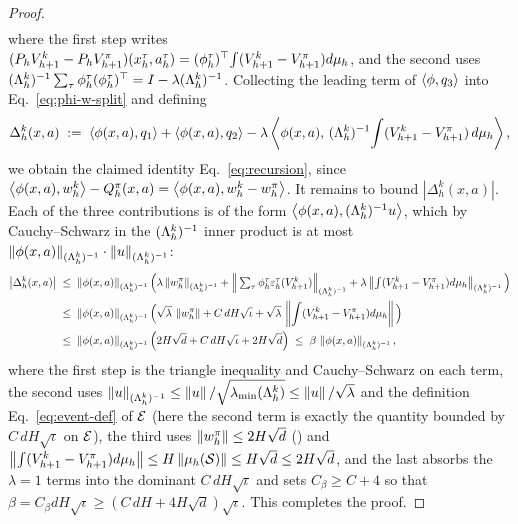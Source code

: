 \begin{proof}
\begin{align*}
\end{align*}
where the first step writes $(P_h V_{h+1}^k-P_h V_{h+1}^\pi)(x_h^\tau,
a_h^\tau)=(\phi_h^\tau)^\top\!\int(V_{h+1}^k-V_{h+1}^\pi)d\mu_h$, and the
second uses $(\Lambda_h^k)^{-1}\sum_\tau\phi_h^\tau(\phi_h^\tau)^\top=
I-\lambda(\Lambda_h^k)^{-1}$. Collecting the leading term of $\left\langle \phi, q_3 \right\rangle$
into Eq.~\eqref{eq:phi-w-split} and defining
\begin{align*}
\Delta_h^k(x,a) \;:=\; \left\langle \phi(x,a), q_1 \right\rangle + \left\langle \phi(x,a), q_2 \right\rangle
- \lambda\left\langle \phi(x,a),\, (\Lambda_h^k)^{-1}\!\int (V_{h+1}^k - V_{h+1}^\pi)\,d\mu_h \right\rangle,
\end{align*}
we obtain the claimed identity Eq.~\eqref{eq:recursion}, since
$\left\langle \phi(x,a), w_h^k \right\rangle-Q_h^\pi(x,a)=\left\langle \phi(x,a), w_h^k-w_h^\pi \right\rangle$.
It remains to bound $|\Delta_h^k(x,a)|$. Each of the three contributions is of
the form $\left\langle \phi(x,a), (\Lambda_h^k)^{-1}u \right\rangle$, which by Cauchy--Schwarz in
the $(\Lambda_h^k)^{-1}$ inner product is at most $\left\| \phi(x,a) \right\|_{(\Lambda_h^k)^{-1}}\cdot\left\| u \right\|_{(\Lambda_h^k)^{-1}}$:
\begin{align*}
\big|\Delta_h^k(x,a)\big|
&\;\le\; \left\| \phi(x,a) \right\|_{(\Lambda_h^k)^{-1}} \Big( \lambda\left\| w_h^\pi \right\|_{(\Lambda_h^k)^{-1}} + \Big\|\textstyle\sum_\tau \phi_h^\tau \varepsilon_h^\tau(V_{h+1}^k)\Big\|_{(\Lambda_h^k)^{-1}} + \lambda\left\| \int (V_{h+1}^k-V_{h+1}^\pi)d\mu_h \right\|_{(\Lambda_h^k)^{-1}} \Big) \\
&\;\le\; \left\| \phi(x,a) \right\|_{(\Lambda_h^k)^{-1}} \Big( \sqrt\lambda\,\left\| w_h^\pi \right\| + C\,dH\sqrt{\iota} + \sqrt\lambda\,\left\| \int (V_{h+1}^k-V_{h+1}^\pi)d\mu_h \right\| \Big) \\
&\;\le\; \left\| \phi(x,a) \right\|_{(\Lambda_h^k)^{-1}} \Big( 2H\sqrt{d} + C\,dH\sqrt{\iota} + 2H\sqrt{d} \Big)
\;\le\; \beta\,\left\| \phi(x,a) \right\|_{(\Lambda_h^k)^{-1}},
\end{align*}
where the first step is the triangle inequality and Cauchy--Schwarz on each
term, the second uses $\left\| u \right\|_{(\Lambda_h^k)^{-1}}\le\left\| u \right\|/\sqrt{\lambda_{\min}
(\Lambda_h^k)}\le\left\| u \right\|/\sqrt\lambda$ and the definition Eq.~\eqref{eq:event-def}
of $\mathcal{E}$ (here the second term is exactly the quantity bounded by $C\,dH
\sqrt{\iota}$ on $\mathcal{E}$), the third uses $\left\| w_h^\pi \right\|\le2H\sqrt d$
() and $\left\| \int(V_{h+1}^k-V_{h+1}^\pi)d\mu_h \right\|\le
H\left\| \mu_h(\mathcal{S}) \right\|\le H\sqrt d\le 2H\sqrt d$, and the last absorbs the
$\lambda=1$ terms into the dominant $C\,dH\sqrt{\iota}$ and sets
$C_\beta\ge C+4$ so that $\beta=C_\beta dH\sqrt{\iota}\ge(C\,dH+4H\sqrt d)
\sqrt{\iota}$. This completes the proof.
\end{proof}

